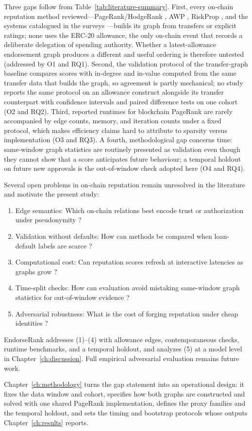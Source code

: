 Three gaps follow from Table~\ref{tab:literature-summary}. First, every on-chain reputation method reviewed---PageRank/HodgeRank , AWP , RiskProp , and the systems catalogued in the surveys ---builds its graph from transfers or explicit ratings; none uses the ERC-20 allowance, the only on-chain event that records a deliberate delegation of spending authority. Whether a latest-allowance endorsement graph produces a different and useful ordering is therefore untested (addressed by O1 and RQ1). Second, the validation protocol of the transfer-graph baseline compares scores with in-degree and in-value computed from the same transfer data that builds the graph, so agreement is partly mechanical; no study reports the same protocol on an allowance construct alongside its transfer counterpart with confidence intervals and paired difference tests on one cohort (O2 and RQ2). Third, reported runtimes for blockchain PageRank are rarely accompanied by edge counts, memory, and iteration counts under a fixed protocol, which makes efficiency claims hard to attribute to sparsity versus implementation (O3 and RQ3). A fourth, methodological gap concerns time: same-window graph statistics are routinely presented as validation even though they cannot show that a score anticipates future behaviour; a temporal holdout on future new approvals is the out-of-window check adopted here (O4 and RQ4).


Several open problems in on-chain reputation remain unresolved in the literature and motivate the present study:

\begin{enumerate}
\item Edge semantics: Which on-chain relations best encode trust or authorization under pseudonymity ?
\item Validation without defaults: How can methods be compared when loan-default labels are scarce ?
\item Computational cost: Can reputation scores refresh at interactive latencies as graphs grow ?
\item Time-split checks: How can evaluation avoid mistaking same-window graph statistics for out-of-window evidence ?
\item Adversarial robustness: What is the cost of forging reputation under cheap identities ?
\end{enumerate}

EndorseRank addresses (1)--(4) with allowance edges, contemporaneous checks, runtime benchmarks, and a temporal holdout, and analyzes (5) at a model level in Chapter~\ref{ch:discussion}. Full empirical adversarial evaluation remains future work.

Chapter~\ref{ch:methodology} turns the gap statement into an operational design: it fixes the data window and cohort, specifies how both graphs are constructed and solved with one shared PageRank implementation, defines the proxy families and the temporal holdout, and sets the timing and bootstrap protocols whose outputs Chapter~\ref{ch:results} reports.

